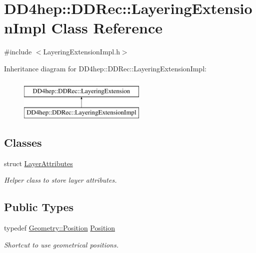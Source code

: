 \hypertarget{class_d_d4hep_1_1_d_d_rec_1_1_layering_extension_impl}{}\section{D\+D4hep\+:\+:D\+D\+Rec\+:\+:Layering\+Extension\+Impl Class Reference}
\label{class_d_d4hep_1_1_d_d_rec_1_1_layering_extension_impl}


{\ttfamily \#include $<$Layering\+Extension\+Impl.\+h$>$}

Inheritance diagram for D\+D4hep\+:\+:D\+D\+Rec\+:\+:Layering\+Extension\+Impl\+:\begin{figure}[H]
\begin{center}
\leavevmode
\includegraphics[height=2.000000cm]{class_d_d4hep_1_1_d_d_rec_1_1_layering_extension_impl}
\end{center}
\end{figure}
\subsection*{Classes}
\begin{DoxyCompactItemize}
\item 
struct \hyperlink{struct_d_d4hep_1_1_d_d_rec_1_1_layering_extension_impl_1_1_layer_attributes}{Layer\+Attributes}
\begin{DoxyCompactList}\small\item\em Helper class to store layer attributes. \end{DoxyCompactList}\end{DoxyCompactItemize}
\subsection*{Public Types}
\begin{DoxyCompactItemize}
\item 
typedef \hyperlink{namespace_d_d4hep_1_1_geometry_a55083902099d03506c6db01b80404900}{Geometry\+::\+Position} \hyperlink{class_d_d4hep_1_1_d_d_rec_1_1_layering_extension_impl_a34281f7585bbe0d61654c9924e2789e3}{Position}
\begin{DoxyCompactList}\small\item\em Shortcut to use geometrical positions. \end{DoxyCompactList}\end{DoxyCompactItemize}
